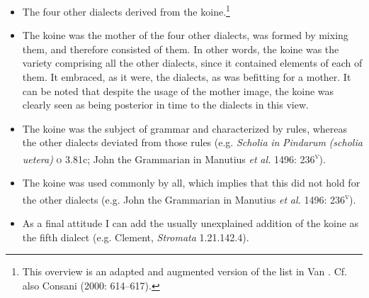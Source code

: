 \begin{itemize}
\item \begin{styleListParagraph}
The four other dialects derived from the koine.\footnote{This overview is an adapted and augmented version of the list in Van \citet[209]{Rooy2016b}. Cf. also Consani (2000: 614–617).}
\end{styleListParagraph}
\item \begin{styleListParagraph}
The koine was the mother of the four other dialects, was formed by mixing them, and therefore consisted of them. In other words, the koine was the variety comprising all the other dialects, since it contained elements of each of them. It embraced, as it were, the dialects, as was befitting for a mother. It can be noted that despite the usage of the mother image, the koine was clearly seen as being posterior in time to the dialects in this view.
\end{styleListParagraph}
\item \begin{styleListParagraph}
The koine was the subject of grammar and characterized by rules, whereas the other dialects deviated from those rules (e.g. \textit{Scholia} \textit{in} \textit{Pindarum} \textit{(scholia} \textit{uetera)} \textsc{o} 3.81c; John the Grammarian in Manutius \textit{et} \textit{al.} 1496: 236\textsc{\textsuperscript{v}}).
\end{styleListParagraph}
\item \begin{styleListParagraph}
The koine was used commonly by all, which implies that this did not hold for the other dialects (e.g. John the Grammarian in Manutius \textit{et} \textit{al.} 1496: 236\textsc{\textsuperscript{v}}).
\end{styleListParagraph}
\item \begin{styleListParagraph}
As a final attitude I can add the usually unexplained addition of the koine as the fifth dialect (e.g. Clement, \textit{Stromata} 1.21.142.4).
\end{styleListParagraph}
\end{itemize}

